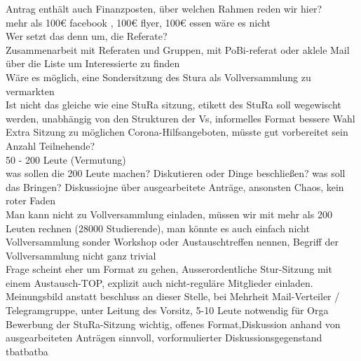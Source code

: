 {        Antrag enthält auch Finanzposten, über welchen Rahmen reden wir hier?\\
            mehr als 100€ facebook , 100€ flyer, 100€ essen wäre es nicht\\
        Wer setzt das denn um, die Referate?\\
            Zusammenarbeit mit Referaten und Gruppen, mit PoBi-referat oder aklele Mail über die Liste um Interessierte zu finden\\
        Wäre es möglich, eine Sondersitzung des Stura als Vollversammlung zu vermarkten\\
            Ist nicht das gleiche wie eine StuRa sitzung, etikett des StuRa soll wegewischt werden, unabhängig von den Strukturen der Vs, informelles Format bessere Wahl\\
            Extra Sitzung zu möglichen Corona-Hilfsangeboten, müsste gut vorbereitet sein\\
        Anzahl Teilnehende?\\
            50 - 200 Leute (Vermutung)\\
        was sollen die 200 Leute machen? Diskutieren oder Dinge beschließen? was soll das Bringen? Diskussiojne über ausgearbeitete Anträge, ansonsten Chaos, kein roter Faden\\
        Man kann nicht zu Vollversammlung einladen, müssen wir mit mehr als 200 Leuten rechnen (28000 Studierende), man könnte es auch einfach nicht Vollversammlung sonder Workshop oder Austauschtreffen nennen, Begriff der Vollversammlung nicht ganz trivial\\
        Frage scheint eher um Format zu gehen, Ausserordentliche Stur-Sitzung mit einem Austausch-TOP, explizit auch nicht-reguläre Mitglieder einladen.\\
        Meinungsbild anstatt beschluss an dieser Stelle, bei Mehrheit Mail-Verteiler / Telegramgruppe, unter Leitung des Vorsitz, 5-10 Leute notwendig für Orga\\
            Bewerbung der StuRa-Sitzung wichtig, offenes Format,Diskussion anhand von ausgearbeiteten Anträgen sinnvoll, vorformulierter Diskussionsgegenstand\\
        
    }{tba}{tba}{tba}

